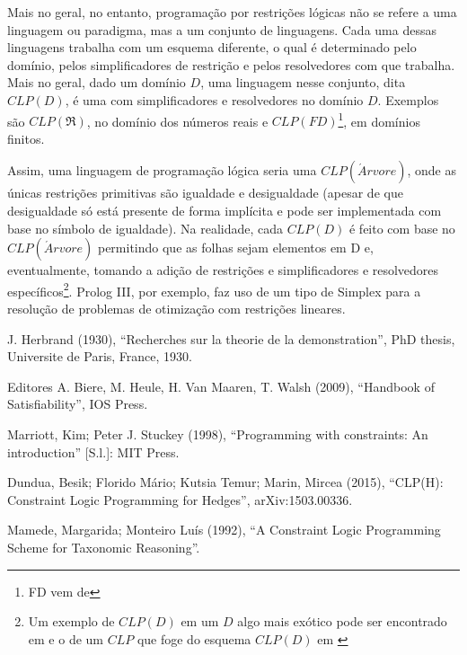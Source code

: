 \documentclass{article}
\begin{document}
Mais no geral, no entanto, programação por restrições lógicas não se refere a uma linguagem ou paradigma, mas a um conjunto
de linguagens. Cada uma dessas linguagens trabalha com um esquema diferente, o qual é determinado pelo domínio,
pelos simplificadores de restrição e pelos resolvedores com que trabalha. Mais no geral, dado um domínio $D$,
uma linguagem nesse conjunto, dita $CLP(D)$, é uma com simplificadores e resolvedores no domínio $D$.
Exemplos são $CLP(\Re)$, no domínio dos números reais e $CLP(FD)$\footnote{FD vem de }, em domínios finitos.

Assim, uma linguagem de programação lógica  seria uma $CLP(\acute{A}rvore)$, onde as únicas restrições primitivas são igualdade e desigualdade (apesar de que desigualdade só está presente de forma implícita e pode ser implementada com base no símbolo de igualdade).
Na realidade, cada $CLP(D)$ é feito com base no $CLP(\acute{A}rvore)$ permitindo que as folhas sejam elementos em D e, eventualmente, tomando a adição de restrições e simplificadores e resolvedores específicos\footnote{Um exemplo de $CLP(D)$ em um $D$ algo mais exótico pode ser encontrado em \cite{besik} e o de um $CLP$ que foge do esquema $CLP(D)$ em \cite{margarida}}. Prolog III, por exemplo, faz uso de um tipo de Simplex para a resolução
de problemas de otimização com restrições lineares.



  \begin{thebibliography}{1}

      J. Herbrand (1930), ``Recherches sur la theorie de la demonstration'', PhD thesis, Universite de Paris, France, 1930.

      Editores A. Biere, M. Heule, H. Van Maaren, T. Walsh (2009), ``Handbook of Satisfiability'', IOS Press.

      Marriott, Kim; Peter J. Stuckey (1998), ``Programming with constraints: An introduction'' [S.l.]: MIT Press.

      Dundua, Besik; Florido Mário; Kutsia Temur; Marin, Mircea (2015), ``CLP(H): Constraint Logic Programming for Hedges'',  	arXiv:1503.00336.

      Mamede, Margarida; Monteiro Luís (1992), ``A Constraint Logic Programming Scheme for Taxonomic Reasoning''.

  \end{thebibliography}
\end{document}
